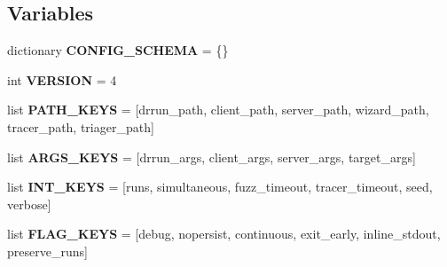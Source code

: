 \subsection*{Variables}
\begin{DoxyCompactItemize}
\item 
\mbox{\label{namespaceharness_1_1config_a5cf930655a1e53fa3fc74e8ce47002f5}} 
dictionary {\bfseries C\+O\+N\+F\+I\+G\+\_\+\+S\+C\+H\+E\+MA} = \{\}
\item 
\mbox{\label{namespaceharness_1_1config_a877fd448c447667a6d48804981a8e4cf}} 
int {\bfseries V\+E\+R\+S\+I\+ON} = 4
\item 
\mbox{\label{namespaceharness_1_1config_a838860b667ad9806000bfa1c1f193378}} 
list {\bfseries P\+A\+T\+H\+\_\+\+K\+E\+YS} = \mbox{[}\textquotesingle{}drrun\+\_\+path\textquotesingle{}, \textquotesingle{}client\+\_\+path\textquotesingle{}, \textquotesingle{}server\+\_\+path\textquotesingle{}, \textquotesingle{}wizard\+\_\+path\textquotesingle{}, \textquotesingle{}tracer\+\_\+path\textquotesingle{}, \textquotesingle{}triager\+\_\+path\textquotesingle{}\mbox{]}
\item 
\mbox{\label{namespaceharness_1_1config_a1332dc619f30f563a25bd699966fac49}} 
list {\bfseries A\+R\+G\+S\+\_\+\+K\+E\+YS} = \mbox{[}\textquotesingle{}drrun\+\_\+args\textquotesingle{}, \textquotesingle{}client\+\_\+args\textquotesingle{}, \textquotesingle{}server\+\_\+args\textquotesingle{}, \textquotesingle{}target\+\_\+args\textquotesingle{}\mbox{]}
\item 
\mbox{\label{namespaceharness_1_1config_a05ecfa6c318c5e170b8e5ab0df79aec2}} 
list {\bfseries I\+N\+T\+\_\+\+K\+E\+YS} = \mbox{[}\textquotesingle{}runs\textquotesingle{}, \textquotesingle{}simultaneous\textquotesingle{}, \textquotesingle{}fuzz\+\_\+timeout\textquotesingle{}, \textquotesingle{}tracer\+\_\+timeout\textquotesingle{}, \textquotesingle{}seed\textquotesingle{}, \textquotesingle{}verbose\textquotesingle{}\mbox{]}
\item 
\mbox{\label{namespaceharness_1_1config_a4b77e3a6b7aa0d064cd387825f21752a}} 
list {\bfseries F\+L\+A\+G\+\_\+\+K\+E\+YS} = \mbox{[}\textquotesingle{}debug\textquotesingle{}, \textquotesingle{}nopersist\textquotesingle{}, \textquotesingle{}continuous\textquotesingle{}, \textquotesingle{}exit\+\_\+early\textquotesingle{}, \textquotesingle{}inline\+\_\+stdout\textquotesingle{}, \textquotesingle{}preserve\+\_\+runs\textquotesingle{}\mbox{]}

\end{DoxyCompactItemize}
